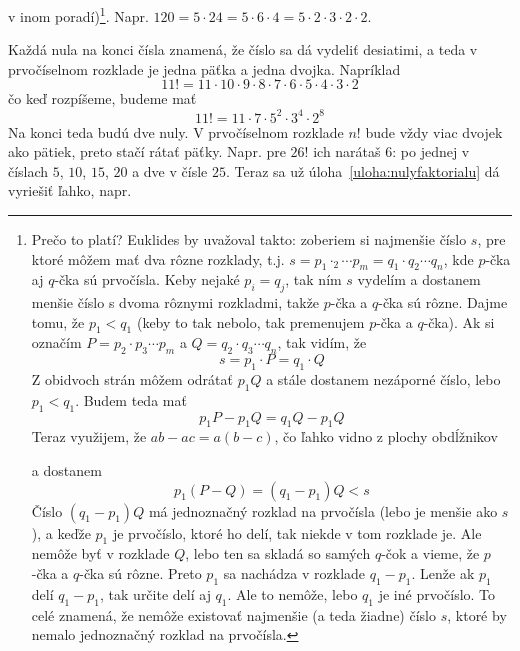 \documentclass[10pt]{article}
\begin{document}
v inom poradí)\footnote{%
  Prečo to platí? Euklides by uvažoval takto: zoberiem si najmenšie číslo $s$,
  pre ktoré môžem mať dva rôzne rozklady, t.j. 
  $s=p_1\cdotp_2\cdots p_m=q_1\cdot q_2\cdots q_n$, kde $p$-čka aj $q$-čka sú prvočísla.
  Keby nejaké $p_i=q_j$, tak ním $s$ vydelím a dostanem menšie číslo s dvoma rôznymi
  rozkladmi, takže $p$-čka a $q$-čka sú rôzne. Dajme tomu, že $p_1<q_1$ (keby to tak nebolo,
  tak premenujem $p$-čka a $q$-čka). Ak si označím $P=p_2\cdot p_3\cdots p_m$
  a $Q=q_2\cdot q_3\cdots q_n$, tak vidím, že
  $$s=p_1\cdot P = q_1\cdot Q$$
  Z obidvoch strán môžem odrátať $p_1Q$ a stále dostanem nezáporné číslo, lebo $p_1<q_1$.
  Budem teda mať
  $$p_1P-p_1Q=q_1Q-p_1Q$$
  Teraz využijem, že $ab-ac=a(b-c)$, čo ľahko vidno z plochy obdĺžnikov

  \centerline{}
  a dostanem
  $$p_1(P-Q)=(q_1-p_1)Q<s$$
  Číslo $(q_1-p_1)Q$ má jednoznačný rozklad na prvočísla (lebo je menšie ako $s$), a keďže
  $p_1$ je prvočíslo, ktoré ho delí, 
  tak niekde v tom rozklade je. Ale nemôže byť v rozklade $Q$, lebo
  ten sa skladá so samých $q$-čok a vieme, že $p$-čka a $q$-čka sú rôzne. Preto $p_1$ sa
  nachádza v rozklade $q_1-p_1$. Lenže ak $p_1$ delí $q_1-p_1$, tak určite delí aj
  $q_1$. Ale to nemôže, lebo $q_1$ je iné prvočíslo. To celé znamená, že nemôže existovať
  najmenšie (a teda žiadne) číslo $s$, ktoré by nemalo jednoznačný rozklad na prvočísla.
}. Napr. $120=5\cdot24=5\cdot6\cdot4=5\cdot2\cdot3\cdot2\cdot2$.

Každá nula na konci čísla znamená, že číslo sa dá vydeliť desiatimi, a teda v prvočíselnom
rozklade je jedna päťka a jedna dvojka. Napríklad 
$$11! = 11\cdot10\cdot9\cdot8\cdot7\cdot6\cdot5\cdot4\cdot3\cdot2$$
čo keď rozpíšeme, budeme mať
$$11! = 11\cdot7\cdot5^2\cdot3^4\cdot2^8$$
Na konci teda budú dve nuly. V prvočíselnom rozklade $n!$ bude vždy viac dvojek ako pätiek,
preto stačí rátať päťky. Napr. pre $26!$ ich narátaš $6$: po jednej v číslach $5$, $10$, $15$,
$20$ a dve v čísle $25$. Teraz sa už úloha~\ref{uloha:nulyfaktorialu} dá vyriešiť ľahko, napr.
\end{document}
